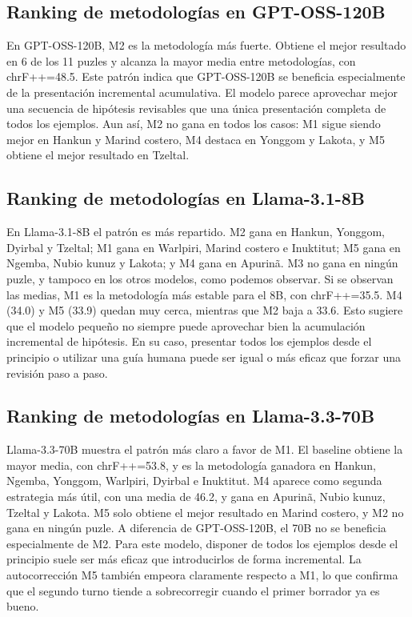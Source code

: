 \subsection*{Ranking de metodologías en GPT-OSS-120B}

En GPT-OSS-120B, M2 es la metodología más fuerte. Obtiene el mejor resultado en 6 de los 11 puzles y alcanza la mayor media entre metodologías, con chrF++=48.5. Este patrón indica que GPT-OSS-120B se beneficia especialmente de la presentación incremental acumulativa. El modelo parece aprovechar mejor una secuencia de hipótesis revisables que una única presentación completa de todos los ejemplos. Aun así, M2 no gana en todos los casos: M1 sigue siendo mejor en Hankun y Marind costero, M4 destaca en Yonggom y Lakota, y M5 obtiene el mejor resultado en Tzeltal.

\subsection*{Ranking de metodologías en Llama-3.1-8B}

En Llama-3.1-8B el patrón es más repartido. M2 gana en Hankun, Yonggom, Dyirbal y Tzeltal; M1 gana en Warlpiri, Marind costero e Inuktitut; M5 gana en Ngemba, Nubio kunuz y Lakota; y M4 gana en Apurinã. M3 no gana en ningún puzle, y tampoco en los otros modelos, como podemos observar. Si se observan las medias, M1 es la metodología más estable para el 8B, con chrF++=35.5. M4 (34.0) y M5 (33.9) quedan muy cerca, mientras que M2 baja a 33.6. Esto sugiere que el modelo pequeño no siempre puede aprovechar bien la acumulación incremental de hipótesis. En su caso, presentar todos los ejemplos desde el principio o utilizar una guía humana puede ser igual o más eficaz que forzar una revisión paso a paso.


\subsection*{Ranking de metodologías en Llama-3.3-70B}

Llama-3.3-70B muestra el patrón más claro a favor de M1. El baseline obtiene la mayor media, con chrF++=53.8, y es la metodología ganadora en Hankun, Ngemba, Yonggom, Warlpiri, Dyirbal e Inuktitut. M4 aparece como segunda estrategia más útil, con una media de 46.2, y gana en Apurinã, Nubio kunuz, Tzeltal y Lakota. M5 solo obtiene el mejor resultado en Marind costero, y M2 no gana en ningún puzle. A diferencia de GPT-OSS-120B, el 70B no se beneficia especialmente de M2. Para este modelo, disponer de todos los ejemplos desde el principio suele ser más eficaz que introducirlos de forma incremental. La autocorrección M5 también empeora claramente respecto a M1, lo que confirma que el segundo turno tiende a sobrecorregir cuando el primer borrador ya es bueno.

